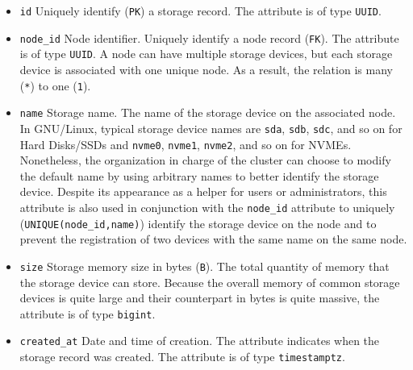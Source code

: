 \begin{itemize}
  \item \texttt{id}
    \newline
    Uniquely identify (\texttt{PK}) a storage record.
    \newline
    The attribute is of type \texttt{UUID}.

  \item \texttt{node\_id}
    \newline
    Node identifier.
    \newline
    Uniquely identify a node record (\texttt{FK}).
    \newline
    The attribute is of type \texttt{UUID}.
    \newline
    A node can have multiple storage devices, but each storage device is
    associated with one unique node. As a result, the relation is many (\texttt{*})
    to one (\texttt{1}).

  \item \texttt{name}
    \newline
    Storage name.
    \newline
    The name of the storage device on the associated node. In GNU/Linux, typical
    storage device names are \texttt{sda}, \texttt{sdb}, \texttt{sdc}, and so on
    for Hard Disks/SSDs and \texttt{nvme0}, \texttt{nvme1}, \texttt{nvme2}, and so
    on for NVMEs. Nonetheless, the organization in charge of the cluster can choose
    to modify the default name by using arbitrary names to better identify the storage
    device.
    \newline
    Despite its appearance as a helper for users or administrators, this attribute
    is also used in conjunction with the \texttt{node\_id} attribute to uniquely
    (\texttt{UNIQUE(node\_id,name)}) identify the storage device on the node and
    to prevent the registration of two devices with the same name on the same
    node.

  \item \texttt{size}
    \newline
    Storage memory size in bytes (\texttt{B}).
    \newline
    The total quantity of memory that the storage device can store.
    \newline
    Because the overall memory of common storage devices is quite large and their
    counterpart in bytes is quite massive, the attribute is of type \texttt{bigint}.

  \item \texttt{created\_at}
    \newline
    Date and time of creation.
    \newline
    The attribute indicates when the storage record was created.
    \newline
    The attribute is of type \texttt{timestamptz}.


\end{itemize}
